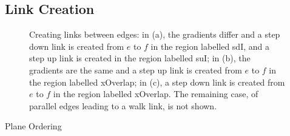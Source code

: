 \documentclass[10pt,twocolumn]{article}
\newenvironment{stusubfig}[1]
{
	\begin{figure}[#1]
	\begin{center}
}
{
	\end{center}
	\end{figure}
}
\begin{document}
\subsection{Link Creation}

\begin{stusubfig}{!t}
        \hspace{4mm}%
        \hspace{4mm}%
\caption{Creating links between edges: in (a), the gradients differ and a step down link is created from $e$ to $f$ in the region labelled sdI, and a step up link is created in the region labelled suI; in (b), the gradients are the same and a step up link is created from $e$ to $f$ in the region labelled xOverlap; in (c), a step down link is created from $e$ to $f$ in the region labelled xOverlap. The remaining case, of parallel edges leading to a walk link, is not shown.}
\label{fig:linkcreation}
\end{stusubfig}

\iffalse
\begin{stulisting}[t]
\caption{Plane Ordering}
\label{code:plane-ordering}

\end{stulisting}
\end{document}
